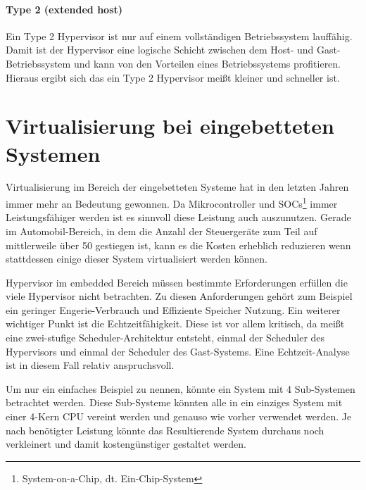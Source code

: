 \documentclass[
  a4paper,					    %
  twoside,
  DIV=calc,     				%
  bibliography=totoc,
  cleardoublepage=empty,
  ngerman,     					%
  final       					%
]{scrbook}
\begin{document}
\paragraph{Type 2 (extended host)} Ein Type 2 Hypervisor ist nur auf einem vollständigen Betriebssystem lauffähig. Damit ist der Hypervisor eine logische Schicht zwischen dem Host- und Gast-Betriebssystem und kann von den Vorteilen eines Betriebssystems profitieren. Hieraus ergibt sich das ein Type 2 Hypervisor meißt kleiner und schneller ist.





\section{Virtualisierung bei eingebetteten Systemen}
\label{sec:EVirtualisierung}
Virtualisierung im Bereich der eingebetteten Systeme hat in den letzten Jahren immer mehr an Bedeutung gewonnen. Da Mikrocontroller und SOCs\footnote{System-on-a-Chip, dt. Ein-Chip-System} immer Leistungsfähiger werden ist es sinnvoll diese Leistung auch auszunutzen. Gerade im Automobil-Bereich, in dem die Anzahl der Steuergeräte zum Teil auf mittlerweile über 50 gestiegen ist, kann es die Kosten erheblich reduzieren wenn stattdessen einige dieser System virtualisiert werden können.

Hypervisor im embedded Bereich müssen bestimmte Erforderungen erfüllen die viele Hypervisor nicht betrachten. Zu diesen Anforderungen gehört zum Beispiel ein geringer Engerie-Verbrauch und Effiziente Speicher Nutzung. Ein weiterer wichtiger Punkt ist die Echtzeitfähigkeit. Diese ist vor allem kritisch, da meißt eine zwei-stufige Scheduler-Architektur entsteht, einmal der Scheduler des Hypervisors und einmal der Scheduler des Gast-Systems. Eine Echtzeit-Analyse ist in diesem Fall relativ anspruchsvoll.

Um nur ein einfaches Beispiel zu nennen, könnte ein System mit 4 Sub-Systemen betrachtet werden. Diese Sub-Systeme könnten alle in ein einziges System mit einer 4-Kern CPU vereint werden und genauso wie vorher verwendet werden. Je nach benötigter Leistung könnte das Resultierende System durchaus noch verkleinert und damit kostengünstiger gestaltet werden.
\end{document}
